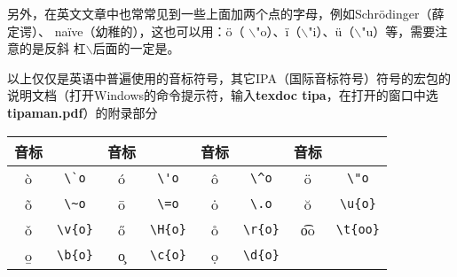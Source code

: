 另外，在英文文章中也常常见到一些上面加两个点的字母，例如{\times  Schr\"odinger}（薛定谔）、
{\times  na\"ive}（幼稚的），这也可以用：{\times\"o}（  $\backslash$"o）、{\times\"i}（$\backslash$"i）、{\times\"u}（$\backslash$"u）等，需要注意的是反斜
杠$\backslash$后面的一定是。

以上仅仅是英语中普遍使用的音标符号，其它IPA（国际音标符号）符号的  宏包的说明文档（打开Windows的命令提示符，输入{\bfseries\times  texdoc  tipa}，在打开的窗口中选
\textbf{\times  tipaman.pdf}）的附录部分

\begin{table}[H]
\centering
\begin{tabular}{|*{8}{c|}}\hline
音标  &    &音标  &    &音标  &  &音标  &    \\
\hline
\`o  &  \verb|\`o|  &
\'o  &  \verb|\'o|  &
\^o  &  \verb|\^o|  &
\"o  &  \verb|\"o|  \\\hline
\~o  &  \verb|\~o|  &
\=o  &  \verb|\=o|  &
\.o  &  \verb|\.o|  &
\u{o}  &  \verb|\u{o}|  \\\hline
\v{o}  &  \verb|\v{o}|  &
\H{o}  &  \verb|\H{o}|  &
\r{o}  &  \verb|\r{o}|  &
\t{oo}  &  \verb|\t{oo}|  \\\hline
\b{o}  &  \verb|\b{o}|  &
\c{o}  &  \verb|\c{o}|  &
\d{o}  &  \verb|\d{o}|  &
&  \\\hline
\end{tabular}

\end{table}